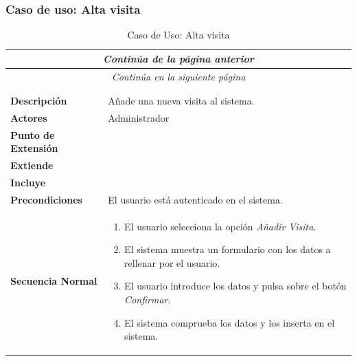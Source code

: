 \newpage
\subsubsection*{Caso de uso: Alta visita }
\begin{longtable}{| p{4cm} | p{10cm} |}
\endfirsthead
\multicolumn{2}{c}{\textit{Continúa de la página anterior}}\\[12pt]
\hline
\endhead
\hline
\multicolumn{2}{c}{\textit{Continúa en la siguiente página}} \\
\endfoot
\hline
\caption{Caso de Uso: Alta visita}\label{fig:1}\\
\endlastfoot


\hline
\multicolumn{2}{|c|}{\textbf{CU$<$32$>$ - Alta Visita}} \\

\hline
\textbf{Descripción} &
Añade una nueva visita al sistema.\\

\hline
\textbf{Actores} &
Administrador\\

\hline
\textbf{Punto de Extensión} &
\\

\hline
\textbf{Extiende} &
\\

\hline
\textbf{Incluye} &
\\

\hline
\textbf{Precondiciones} &
El usuario está autenticado en el sistema.\\

\hline
\textbf{Secuencia Normal} &\mbox{}\par\vspace{-\baselineskip}
\begin{enumerate}[leftmargin=0.7cm, topsep=0.1cm]
\item El usuario selecciona la opción \textit{Añadir Visita}.
\item El sistema muestra un formulario con los datos a rellenar por el usuario.
\item El usuario introduce los datos y pulsa sobre el botón \textit{Confirmar}.
\item El sistema comprueba los datos y los inserta en el sistema.
\end{enumerate}



\end{longtable}
